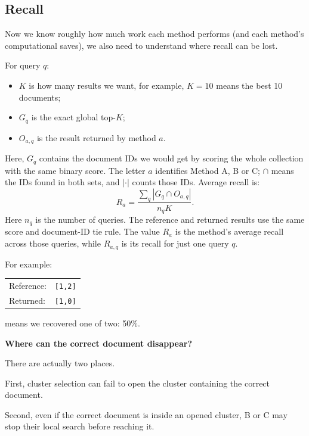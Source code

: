 \subsection{Recall}
Now we know roughly how much work each method performs (and each method's computational saves), we also need to understand where recall can be lost.

For query $q$:
\begin{itemize}\setlength{\itemsep}{1pt}
\item $K$ is how many results we want, for example, $K=10$ means the best 10 documents;
\item $G_q$ is the exact global top-$K$;
\item $O_{a,q}$ is the result returned by method $a$.
\end{itemize}
Here, $G_q$ contains the document IDs we would get by scoring the whole collection with the same binary score. The letter $a$ identifies Method A, B or C; $\cap$ means the IDs found in both sets, and $|\cdot|$ counts those IDs.
Average recall is:
\[
R_a=\frac{\sum_q|G_q\cap O_{a,q}|}{n_qK}.
\]
Here $n_q$ is the number of queries. The reference and returned results use the same score and document-ID tie rule.
The value $R_a$ is the method's average recall across those queries, while $R_{a,q}$ is its recall for just one query $q$.

For example:
\begin{center}
\begin{tabular}{@{}ll@{}}
Reference: & \texttt{[1,2]}\\
Returned: & \texttt{[1,0]}
\end{tabular}
\end{center}
means we recovered one of two: 50\%.

\textbf{Where can the correct document disappear?}\par
There are actually two places.

First, cluster selection can fail to open the cluster containing the correct document.

Second, even if the correct document is inside an opened cluster, B or C may stop their local search before reaching it.

